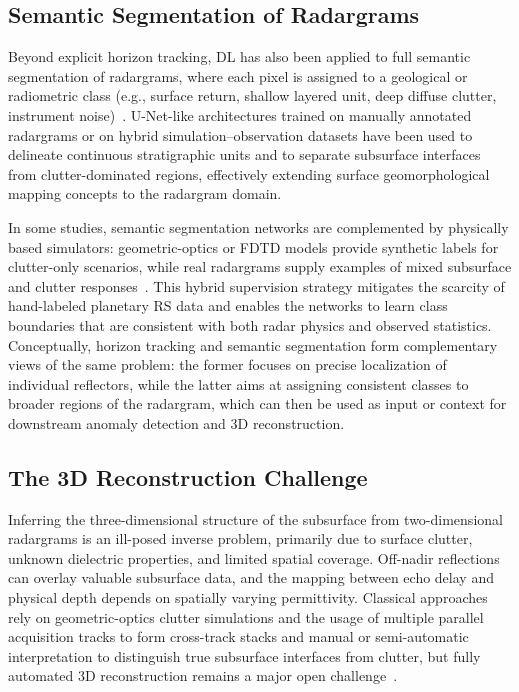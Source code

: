 \subsection{Semantic Segmentation of Radargrams}
Beyond explicit horizon tracking, DL has also been applied to full semantic segmentation of radargrams, where each pixel is assigned to a geological or radiometric class (e.g., surface return, shallow layered unit, deep diffuse clutter, instrument noise)~\cite{yebasse2025advances}.
U-Net-like architectures trained on manually annotated radargrams or on hybrid simulation–observation datasets have been used to delineate continuous stratigraphic units and to separate subsurface interfaces from clutter-dominated regions, effectively extending surface geomorphological mapping concepts to the radargram domain.

In some studies, semantic segmentation networks are complemented by physically based simulators: geometric-optics or FDTD models provide synthetic labels for clutter-only scenarios, while real radargrams supply examples of mixed subsurface and clutter responses~\cite{Warren_2016,yebasse2025advances}.
This hybrid supervision strategy mitigates the scarcity of hand-labeled planetary RS data and enables the networks to learn class boundaries that are consistent with both radar physics and observed statistics.
Conceptually, horizon tracking and semantic segmentation form complementary views of the same problem: the former focuses on precise localization of individual reflectors, while the latter aims at assigning consistent classes to broader regions of the radargram, which can then be used as input or context for downstream anomaly detection and 3D reconstruction.

\subsection{The 3D Reconstruction Challenge}
Inferring the three-dimensional structure of the subsurface from two-dimensional radargrams is an ill-posed inverse problem, primarily due to surface clutter, unknown dielectric properties, and limited spatial coverage.
Off-nadir reflections can overlay valuable subsurface data, and the mapping between echo delay and physical depth depends on spatially varying permittivity.
Classical approaches rely on geometric-optics clutter simulations and the usage of multiple parallel acquisition tracks to form cross-track stacks and manual or semi-automatic interpretation to distinguish true subsurface interfaces from clutter, but fully automated 3D reconstruction remains a major open challenge~\cite{foss2017sharad3d,yebasse2025advances}.

